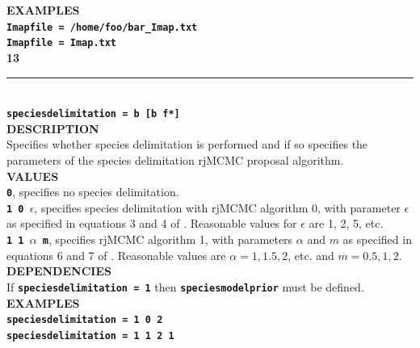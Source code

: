 \documentclass[a4paper]{book}
\numberwithin{equation}{section} \renewcommand{\baselinestretch}{0.55}
\begin{document}
\textbf{EXAMPLES} \vspace{5pt}\\
\textbf{\texttt{Imapfile = /home/foo/bar\_Imap.txt}} \vspace{5pt}\\
\textbf{\texttt{Imapfile = Imap.txt}} \vspace{10pt}\\
\textbf{{\large 13}} \\
\noindent\rule{\textwidth}{0.8pt} \\
\textbf{{\Large \texttt{speciesdelimitation = b [b f*]}}} \vspace{5pt}\\
\textbf{DESCRIPTION} \vspace{5pt}\\
Specifies whether species delimitation is performed and if so
specifies the parameters of the species delimitation rjMCMC proposal
algorithm. \vspace{5pt}\\
\textbf{VALUES} \vspace{5pt}\\
\textbf{\texttt{0}}, specifies no species delimitation. \vspace{5pt}\\
\textbf{\texttt{1 0 $\epsilon$}}, specifies species delimitation with rjMCMC algorithm 0, with parameter $\epsilon$ as specified in equations 3 and 4 of \cite{Yang2010}.  Reasonable values for $\epsilon$ are 1, 2, 5, etc. \vspace{5pt}\\
\textbf{\texttt{1 1 $\alpha$ m}}, specifies rjMCMC algorithm 1, with
parameters $ \alpha$ and $m$ as specified in equations 6 and 7 of
\cite{Yang2010}. Reasonable values are $\alpha = 1, 1.5, 2$, etc. and $m = 0.5, 1, 2$. \vspace{5pt}\\
\textbf{DEPENDENCIES} \vspace{5pt}\\
If \textbf{\texttt{speciesdelimitation = 1}} then \textbf{\texttt{speciesmodelprior}} must be defined. \vspace{5pt}\\
\textbf{EXAMPLES} \vspace{5pt}\\
\textbf{\texttt{speciesdelimitation = 1 0 2}} \vspace{5pt}\\
\textbf{\texttt{speciesdelimitation = 1 1 2 1}}\vspace{10pt}\\
\end{document}
